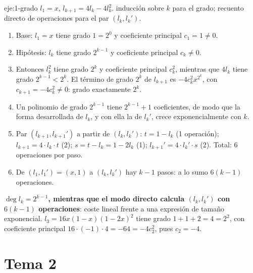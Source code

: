 \begin{solucion}{eje:1-grado}
\datos $l_1=x$, $l_{k+1}=4l_k-4l_k^{2}$.
\planteamiento inducción sobre $k$ para el grado; recuento directo de operaciones para el par $(l_k,l_k')$.
\pasos
\begin{enumerate}[label=\arabic*.]
  \item Base: $l_1=x$ tiene grado $1=2^{0}$ y coeficiente principal $c_1=1\ne 0$.
  \item Hipótesis: $l_k$ tiene grado $2^{k-1}$ y coeficiente principal $c_k\ne 0$.
  \item Entonces $l_k^{2}$ tiene grado $2^{k}$ y coeficiente principal $c_k^{2}$, mientras que $4l_k$ tiene grado $2^{k-1}<2^{k}$. El término de grado $2^{k}$ de $l_{k+1}$ es $-4c_k^{2}x^{2^{k}}$, con $c_{k+1}=-4c_k^{2}\ne 0$: grado exactamente $2^{k}$.
  \item Un polinomio de grado $2^{k-1}$ tiene $2^{k-1}+1$ coeficientes, de modo que la forma desarrollada de $l_k$, y con ella la de $l_k'$, crece exponencialmente con $k$.
  \item Par $(l_{k+1},l_{k+1}')$ a partir de $(l_k,l_k')$: $t=1-l_k$ (1 operación); $l_{k+1}=4\cdot l_k\cdot t$ (2); $s=t-l_k=1-2l_k$ (1); $l_{k+1}'=4\cdot l_k'\cdot s$ (2). Total: 6 operaciones por paso.
  \item De $(l_1,l_1')=(x,1)$ a $(l_k,l_k')$ hay $k-1$ pasos: a lo sumo $6(k-1)$ operaciones.
\end{enumerate}
\resultado \textbf{$\deg l_k=2^{k-1}$, mientras que el modo directo calcula $(l_k,l_k')$ con $6(k-1)$ operaciones}: coste lineal frente a una expresión de tamaño exponencial.
\comprobacion $l_3=16x(1-x)(1-2x)^{2}$ tiene grado $1+1+2=4=2^{2}$, con coeficiente principal $16\cdot(-1)\cdot 4=-64=-4c_2^{2}$, pues $c_2=-4$.
\end{solucion}

\section{Tema 2}

